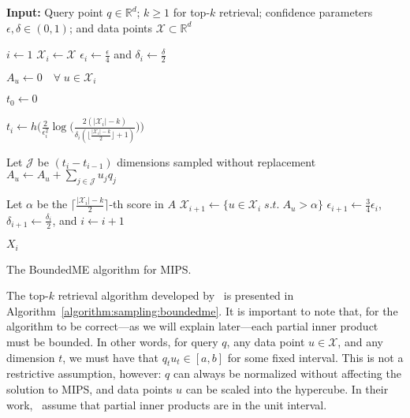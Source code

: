 \begin{algorithm}[!t]
\SetAlgoLined
{\bf Input: }{Query point $q \in \mathbb{R}^d$; $k \geq 1$ for top-$k$ retrieval;
confidence parameters $\epsilon, \delta \in (0, 1)$; and data points $\mathcal{X} \subset \mathbb{R}^d$}\\

\begin{algorithmic}[1]

\STATE $i \leftarrow 1$
\STATE $\mathcal{X}_i \leftarrow \mathcal{X}$ 
\STATE $\epsilon_i \leftarrow \frac{\epsilon}{4}$ and $\delta_i \leftarrow \frac{\delta}{2}$

\STATE $A_u \leftarrow 0 \quad \forall \; u \in \mathcal{X}_i$ 

\STATE $t_0 \leftarrow 0$

    \STATE $t_i \leftarrow h\Bigg( \frac{2}{\epsilon_i^2} \log \Big(
        \frac{2(\lvert \mathcal{X}_i \rvert - k)}{\delta_i (\lfloor \frac{\lvert \mathcal{X}_i \rvert - k}{2} \rfloor + 1)}
    \Big) \Bigg)$ \label{algorithm:sampling:boundedme:num-samples}

        \STATE Let $\mathcal{J}$ be $(t_i - t_{i - 1})$ dimensions sampled without replacement
        \label{algorithm:sampling:boundedme:sampled-dimensions}
        \STATE $A_u \leftarrow A_u + \sum_{j \in \mathcal{J}} u_j q_j$ \label{algorithm:sampling:boundedme:partial-ip}
    \ENDFOR

    \STATE Let $\alpha$ be the $\lceil \frac{\lvert \mathcal{X}_i \rvert - k}{2} \rceil$-th score in $A$
    \STATE $\mathcal{X}_{i + 1} \leftarrow \{ u \in \mathcal{X}_i \; \mathit{ s.t. } \; A_u > \alpha \}$
    \STATE $\epsilon_{i + 1} \leftarrow \frac{3}{4} \epsilon_i$,
    $\delta_{i + 1} \leftarrow \frac{\delta_i}{2}$, and $i \leftarrow i + 1$
\ENDWHILE

\RETURN $X_i$
\end{algorithmic}
\caption{The BoundedME algorithm for MIPS.}
\label{algorithm:sampling:boundedme}
\end{algorithm}

The top-$k$ retrieval algorithm developed by~\cite{Liu2019banditMIPS} is presented in
Algorithm~\ref{algorithm:sampling:boundedme}. It is important to note that,
for the algorithm to be correct---as we will explain later---each partial inner product
must be bounded. In other words, for query $q$, any data point $u \in \mathcal{X}$,
and any dimension $t$, we must have that $q_t u_t \in [a, b]$ for some fixed interval.
This is not a restrictive assumption, however: $q$ can always be normalized without
affecting the solution to MIPS, and data points $u$ can be scaled into the hypercube.
In their work,~\cite{Liu2019banditMIPS} assume that partial inner products are 
in the unit interval.

